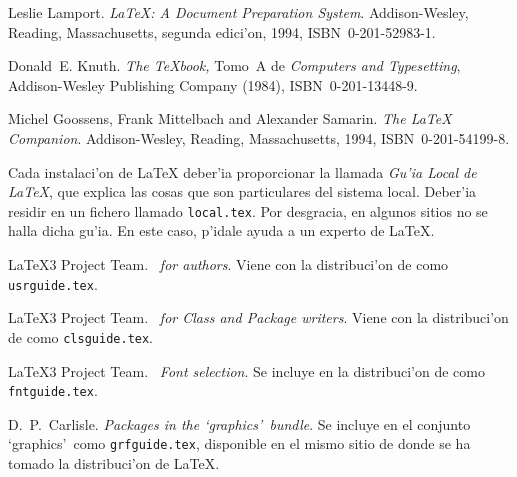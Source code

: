 
\begin{thebibliography}{99}
\ifx\pdfoutput\undefined %
\else
{}
\fi

 Leslie Lamport.  \newblock \emph{{\LaTeX:} A Document
    Preparation System}.  \newblock Addison-Wesley, Reading,
  Massachusetts, segunda edici'on, 1994, ISBN~0-201-52983-1.

 Donald~E. Knuth.  \newblock \textit{The \TeX{}book,}
  Tomo~A de \textit{Computers and Typesetting}, Addison-Wesley
  Publishing Company (1984), ISBN~0-201-13448-9.

 Michel Goossens, Frank Mittelbach and Alexander
  Samarin.  \newblock \emph{The {\LaTeX} Companion}.  \newblock
  Addison-Wesley, Reading, Massachusetts, 1994, ISBN~0-201-54199-8.
 
 Cada instalaci'on de  \LaTeX{} deber'ia proporcionar
  la llamada \emph{Gu'ia Local de \LaTeX}, que explica las cosas que
  son particulares del sistema local. Deber'ia residir en un fichero
  llamado \texttt{local.tex}. Por desgracia, en algunos sitios no se
  halla dicha gu'ia. En este caso, p'idale ayuda a un experto de
  \LaTeX.
 
 \LaTeX3 Project Team.  \newblock \emph{\LaTeXe~for
    authors}.  \newblock Viene con la distribuci'on de \LaTeXe{} como
  \texttt{usrguide.tex}.

 \LaTeX3 Project Team.  \newblock \emph{\LaTeXe~for
    Class and Package writers}.  \newblock Viene con la distribuci'on
    de \LaTeXe{} como \texttt{clsguide.tex}.

 \LaTeX3 Project Team.  \newblock \emph{\LaTeXe~Font
    selection}.  \newblock Se incluye en la distribuci'on de \LaTeXe{}
    como \texttt{fntguide.tex}.

 D.~P.~Carlisle.  \newblock \emph{Packages in the
    `graphics'\ bundle}.  \newblock Se incluye en el conjunto `graphics'\
  como \texttt{grfguide.tex}, disponible en el mismo sitio de donde se
  ha tomado la distribuci'on de \LaTeX.
\end{thebibliography}
